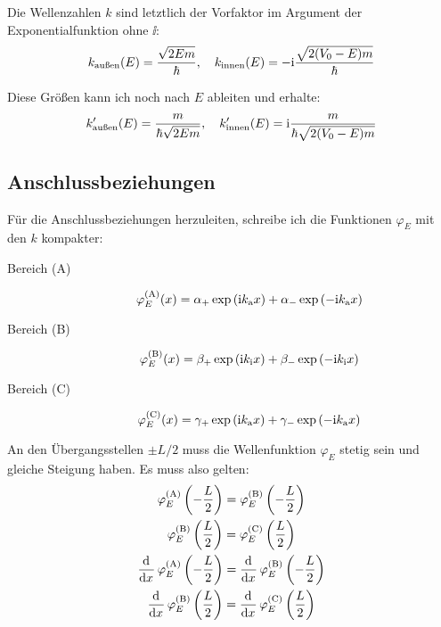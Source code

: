 Die Wellenzahlen $k$ sind letztlich der Vorfaktor im Argument der
Exponentialfunktion ohne $\ii$:
\[
	k_\text{außen}(E) = \frac{\sqrt{2Em}}\hbar
	,\quad
	k_\text{innen}(E) = - \mathrm i \frac{\sqrt{2(V_0-E)m}}\hbar
\]

Diese Größen kann ich noch nach $E$ ableiten und erhalte:
\[
	k'_\text{außen}(E) = \frac{m}{\hbar\sqrt{2Em}}
	,\quad
	k'_\text{innen}(E) = \mathrm i \frac{m}{\hbar\sqrt{2(V_0-E)m}}
\]

\subsection{Anschlussbeziehungen}

Für die Anschlussbeziehungen herzuleiten, schreibe ich die Funktionen
$\varphi_E$ mit den $k$ kompakter:

\newcommand{\ki}{k_\text{i}}
\newcommand{\ka}{k_\text{a}}

\begin{description}
	\item[Bereich (A)]
		\[
			\phiA(x) = \alpha_+ \exp\del{\ii \ka x}
			+ \alpha_- \exp\del{-\ii \ka x}
		\]

	\item[Bereich (B)]
		\[
			\phiB(x) = \beta_+ \exp\del{\ii \ki x}
			+ \beta_- \exp\del{-\ii \ki x}
		\]

	\item[Bereich (C)]
		\[
			\phiC(x) = \gamma_+ \exp\del{\ii \ka x}
			+ \gamma_- \exp\del{-\ii \ka x}
		\]
\end{description}

An den Übergangsstellen $\pm L/2$ muss die Wellenfunktion $\varphi_E$ stetig
sein und gleiche Steigung haben. Es muss also gelten:
\begin{gather*}
	\phiA\del{-\frac L2} = \phiB\del{-\frac L2} \\
	\phiB\del{\frac L2} = \phiC\del{\frac L2} \\
	\dod{}x \phiA\del{-\frac L2} = \dod{}x \phiB\del{-\frac L2} \\
	\dod{}x \phiB\del{\frac L2} = \dod{}x \phiC\del{\frac L2} \\
\end{gather*}


\IfFileExists{\bibliographyfile}{
}{}



